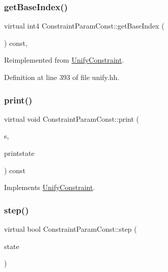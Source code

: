 \subsubsection{\texorpdfstring{getBaseIndex()}{getBaseIndex()}}
{\footnotesize\ttfamily virtual int4 Constraint\+Param\+Const\+::get\+Base\+Index (\begin{DoxyParamCaption}\item[{void}]{ }\end{DoxyParamCaption}) const\hspace{0.3cm}{\ttfamily [inline]}, {\ttfamily [virtual]}}



Reimplemented from \mbox{\hyperlink{class_unify_constraint_a44f0164f38ac1fdc44fc73ebe7678de1}{Unify\+Constraint}}.



Definition at line 393 of file unify.\+hh.

\mbox{\label{class_constraint_param_const_a64c35324d7bed202b854edb51a0abc08}} 
\subsubsection{\texorpdfstring{print()}{print()}}
{\footnotesize\ttfamily virtual void Constraint\+Param\+Const\+::print (\begin{DoxyParamCaption}\item[{ostream \&}]{s,  }\item[{\mbox{\hyperlink{class_unify_c_printer}{Unify\+C\+Printer}} \&}]{printstate }\end{DoxyParamCaption}) const\hspace{0.3cm}{\ttfamily [virtual]}}



Implements \mbox{\hyperlink{class_unify_constraint_a774f6a611a96384766cb8e8d8f5ff41f}{Unify\+Constraint}}.

\mbox{\label{class_constraint_param_const_a938ee0ec5d67dd37947de4fb59a225bf}} 
\subsubsection{\texorpdfstring{step()}{step()}}
{\footnotesize\ttfamily virtual bool Constraint\+Param\+Const\+::step (\begin{DoxyParamCaption}\item[{\mbox{\hyperlink{class_unify_state}{Unify\+State}} \&}]{state }\end{DoxyParamCaption})\hspace{0.3cm}{\ttfamily [virtual]}}



